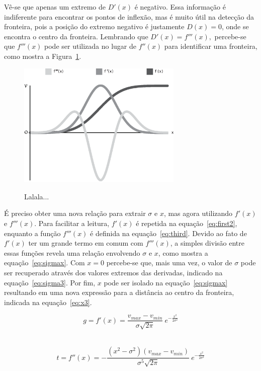 	Vê-se que apenas um extremo de $ D'(x) $ é negativo. Essa informação é indiferente para encontrar os pontos de inflexão, mas é muito útil na detecção da fronteira, pois a posição do extremo negativo é justamente $ D(x) = 0 $, onde se encontra o centro da fronteira. Lembrando que $ D'(x) = f'''(x), $ percebe-se que $ f'''(x) $ pode ser utilizada no lugar de $ f''(x) $ para identificar uma fronteira, como mostra a Figura~\ref{fig:m_functions}.
	
\begin{figure}[h]
	\centering
	\includegraphics[width=0.7\textwidth]{images/m_functions}
	\label{fig:m_functions}
	\caption{Lalala...}
\end{figure}

	É preciso obter uma nova relação para extrair $ \sigma $ e $ x $, mas agora utilizando $ f'(x) $ e $ f'''(x) $. Para facilitar a leitura, $ f'(x) $ é repetida na equação~\eqref{eq:first2}, enquanto a função $ f'''(x) $ é definida na equação~\eqref{eq:third}. Devido ao fato de $ f'(x) $ ter um grande termo em comum com $ f'''(x) $, a simples divisão entre essas funções revela uma relação envolvendo $ \sigma $ e $ x $, como mostra a equação~\eqref{eq:sigmax}. Com $ x = 0 $ percebe-se que, mais uma vez, o valor de $ \sigma $ pode ser recuperado através dos valores extremos das derivadas, indicado na equação~\eqref{eq:sigma3}. Por fim, $ x $ pode ser isolado na equação~\eqref{eq:sigmax} resultando em uma nova expressão para a distância ao centro da fronteira, indicada na equação~\eqref{eq:x3}.
	\
	
\begin{equation} \label{eq:first2}
	g = f'(x) = \frac{v_{max} - v_{min}}{\sigma\sqrt{2\pi}}\ e^{-\frac{x^{2}}{2\sigma^{2}}}
\end{equation} \
	
\begin{equation} \label{eq:third}
	t = f''(x) = -\frac{(x^{2} - \sigma^{2})(v_{max} - v_{min})}{\sigma^{5}\sqrt{2\pi}}\ e^{-\frac{x^{2}}{2\sigma^{2}}}
\end{equation} \

